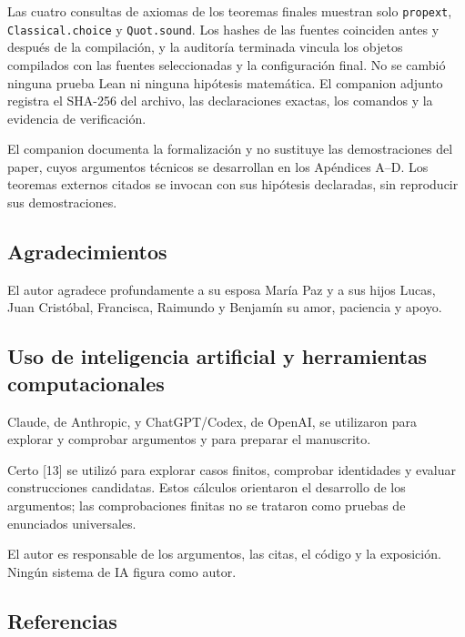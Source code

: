 \documentclass[spanish,11pt,a4paper]{article}
\begin{document}
Las cuatro consultas de axiomas de los teoremas finales muestran solo \texttt{propext}, \texttt{Classical.\allowbreak{}choice} y \texttt{Quot.\allowbreak{}sound}. Los hashes de las fuentes coinciden antes y después de la compilación, y la auditoría terminada vincula los objetos compilados con las fuentes seleccionadas y la configuración final. No se cambió ninguna prueba Lean ni ninguna hipótesis matemática. El companion adjunto registra el SHA-256 del archivo, las declaraciones exactas, los comandos y la evidencia de verificación.

El companion documenta la formalización y no sustituye las demostraciones del paper, cuyos argumentos técnicos se desarrollan en los Apéndices A--D. Los teoremas externos citados se invocan con sus hipótesis declaradas, sin reproducir sus demostraciones.

\subsection{Agradecimientos}\label{agradecimientos}

El autor agradece profundamente a su esposa María Paz y a sus hijos Lucas, Juan Cristóbal, Francisca, Raimundo y Benjamín su amor, paciencia y apoyo.

\subsection{Uso de inteligencia artificial y herramientas computacionales}\label{uso-de-inteligencia-artificial-y-herramientas-computacionales}

Claude, de Anthropic, y ChatGPT/Codex, de OpenAI, se utilizaron para explorar y comprobar argumentos y para preparar el manuscrito.

Certo {[}13{]} se utilizó para explorar casos finitos, comprobar identidades y evaluar construcciones candidatas. Estos cálculos orientaron el desarrollo de los argumentos; las comprobaciones finitas no se trataron como pruebas de enunciados universales.

El autor es responsable de los argumentos, las citas, el código y la exposición. Ningún sistema de IA figura como autor.


\subsection{Referencias}\label{referencias}

\begingroup\small\raggedright
\end{document}
